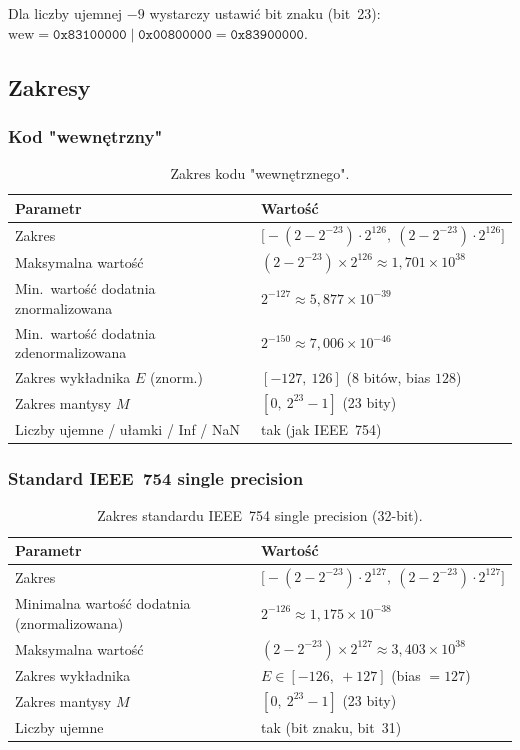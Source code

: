 \documentclass[12pt,a4paper]{article}
\begin{document}
Dla liczby ujemnej $-9$ wystarczy ustawić bit znaku (bit~23):
$\text{wew} = \texttt{0x83100000} \mid \texttt{0x00800000} = \texttt{0x83900000}$.

\subsection*{Zakresy}

\subsubsection*{Kod "wewnętrzny"}

\begin{table}[H]
\centering
\begin{tabular}{ll}
\toprule
\textbf{Parametr} & \textbf{Wartość} \\
\midrule
Zakres & $\bigl[-(2-2^{-23})\cdot2^{126},\ (2-2^{-23})\cdot2^{126}\bigr]$ \\
Maksymalna wartość          & $(2 - 2^{-23}) \times 2^{126} \approx 1{,}701 \times 10^{38}$ \\
Min.\ wartość dodatnia znormalizowana & $2^{-127} \approx 5{,}877 \times 10^{-39}$ \\
Min.\ wartość dodatnia zdenormalizowana & $2^{-150} \approx 7{,}006 \times 10^{-46}$ \\
Zakres wykładnika $E$ (znorm.) & $[-127,\ 126]$ (8 bitów, bias $128$) \\
Zakres mantysy $M$          & $[0,\ 2^{23}-1]$ (23 bity) \\
Liczby ujemne / ułamki / Inf / NaN & tak (jak IEEE~754) \\
\bottomrule
\end{tabular}
\caption{Zakres kodu "wewnętrznego".}
\end{table}

\subsubsection*{Standard IEEE~754 single precision}

\begin{table}[H]
\centering
\begin{tabular}{ll}
\toprule
\textbf{Parametr} & \textbf{Wartość} \\
\midrule
Zakres & $\bigl[-(2-2^{-23})\cdot2^{127},\ (2-2^{-23})\cdot2^{127}\bigr]$ \\
Minimalna wartość dodatnia (znormalizowana) & $2^{-126} \approx 1{,}175 \times 10^{-38}$ \\
Maksymalna wartość & $(2 - 2^{-23}) \times 2^{127} \approx 3{,}403 \times 10^{38}$ \\
Zakres wykładnika & $E \in [-126,\ +127]$ (bias $= 127$) \\
Zakres mantysy $M$ & $[0,\ 2^{23}-1]$ (23 bity) \\
Liczby ujemne & tak (bit znaku, bit~31) \\
\bottomrule
\end{tabular}
\caption{Zakres standardu IEEE~754 single precision (32-bit).}
\end{table}
\end{document}
